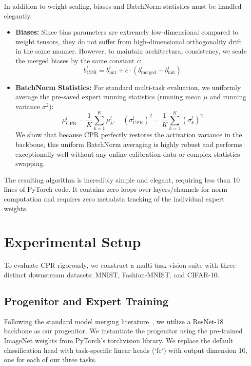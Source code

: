 \documentclass{article}
\theoremstyle{plain}
\theoremstyle{definition}
\theoremstyle{remark}
\begin{document}
In addition to weight scaling, biases and BatchNorm statistics must be handled elegantly.
\begin{itemize}
\item \textbf{Biases:} Since bias parameters are extremely low-dimensional compared to weight tensors, they do not suffer from high-dimensional orthogonality drift in the same manner. However, to maintain architectural consistency, we scale the merged biases by the same constant $c$:
\begin{equation}
b_{\text{CPR}}^l = b_{\text{init}}^l + c \cdot (b_{\text{merged}}^l - b_{\text{init}}^l)
\end{equation}
\item \textbf{BatchNorm Statistics:} For standard multi-task evaluation, we uniformly average the pre-saved expert running statistics (running mean $\mu$ and running variance $\sigma^2$):
\begin{equation}
\mu_{\text{CPR}}^l = \frac{1}{K} \sum_{k=1}^K \mu_k^l, \quad (\sigma_{\text{CPR}}^l)^2 = \frac{1}{K} \sum_{k=1}^K (\sigma_k^l)^2
\end{equation}
We show that because CPR perfectly restores the activation variance in the backbone, this uniform BatchNorm averaging is highly robust and performs exceptionally well without any online calibration data or complex statistics-swapping.
\end{itemize}

The resulting algorithm is incredibly simple and elegant, requiring less than 10 lines of PyTorch code. It contains zero loops over layers/channels for norm computation and requires zero metadata tracking of the individual expert weights.

\section{Experimental Setup}
\label{sec:experiments}

To evaluate CPR rigorously, we construct a multi-task vision suite with three distinct downstream datasets: MNIST, Fashion-MNIST, and CIFAR-10.

\subsection{Progenitor and Expert Training}
Following the standard model merging literature~\cite{hns2025}, we utilize a ResNet-18 backbone as our progenitor. We instantiate the progenitor using the pre-trained ImageNet weights from PyTorch's torchvision library. We replace the default classification head with task-specific linear heads (`fc`) with output dimension 10, one for each of our three tasks.
\end{document}
